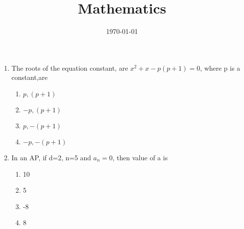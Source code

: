 \documentclass[12pt,-letter paper]{article}
\title{Mathematics}
\date{\today}
\providecommand{\brak}[1]{\ensuremath{\left(#1\right)}}
\theoremstyle{remark}
\begin{document}
\graphicspath{{/storage/emulated/0/Assignimages/}}
\begin{enumerate}
	\item The roots of the equation constant, are $x^2+x-p\brak{p+1}=0$, where p is a constant,are
    \begin{enumerate}
        \item $p,\brak{p+1}$
        \item $-p,\brak{p+1}$
        \item $p,-\brak{p+1}$
        \item $-p,-\brak{p+1}$
    \end{enumerate}
    \item In an AP, if d=2, n=5 and $a_n=0$, then value of a is
    \begin{enumerate}
        \item 10
        \item 5
        \item -8
        \item 8
    \end{enumerate}
    

\end{enumerate}
\end{document}

